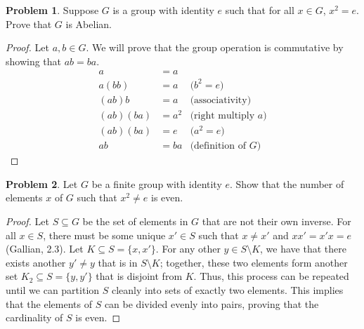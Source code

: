 \documentclass[12pt,reqno]{article}
\theoremstyle{plain}
\theoremstyle{definition}
\newtheorem{problem}{Problem}
\begin{document}
\newpage


\begin{problem} Suppose $G$ is a group with identity $e$ such that for all $x \in G$, $x^2 = e$. Prove that $G$ is Abelian.
\end{problem}

\begin{proof}
    Let $a,b\in G$. We will prove that the group operation is commutative by showing that $ab=ba$.
    \begin{align*}
        a &= a\\
        a(bb) &= a & \text{($b^2=e$)}\\
        (ab)b &= a & \text{(associativity)}\\
        (ab)(ba) &= a^2 & \text{(right multiply $a$)}\\
        (ab)(ba) &= e & \text{($a^2=e$)}\\
        ab &= ba & \text{(definition of $G$)}
    \end{align*}
\end{proof}

\newpage


\begin{problem} Let $G$ be a finite group with identity $e$. Show that the number of elements $x$ of $G$ such that $x^2 \not = e$ is even.
\end{problem}

\begin{proof}
    Let $S\subseteq G$ be the set of elements in $G$ that are not their own inverse. For all $x\in S$, there must be some unique $x'\in S$ such that $x\neq x'$ and $xx'=x'x=e$ (Gallian, 2.3). Let $K\subseteq S = \{x,x'\}$. For any other $y\in S\setminus K$, we have that there exists another $y'\neq y$ that is in $S\setminus K$; together, these two elements form another set $K_2\subseteq S = \{y,y'\}$ that is disjoint from $K$. Thus, this process can be repeated until we can partition $S$ cleanly into sets of exactly two elements. This implies that the elements of $S$ can be divided evenly into pairs, proving that the cardinality of $S$ is even.
\end{proof}
\end{document}
